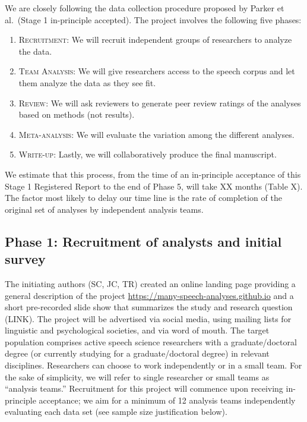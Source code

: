 \documentclass[
  12pt,
]{article}
\providecommand{\tightlist}{%
  \setlength{\itemsep}{0pt}\setlength{\parskip}{0pt}}
\begin{document}
We are closely following the data collection procedure proposed by Parker et al.~(Stage 1 in-principle accepted).
The project involves the following five phases:

\begin{enumerate}
\def\labelenumi{\arabic{enumi}.}
\tightlist
\item
  \textsc{Recruitment}: We will recruit independent groups of researchers to analyze the data.
\item
  \textsc{Team Analysis}: We will give researchers access to the speech corpus and let them analyze the data as they see fit.
\item
  \textsc{Review}: We will ask reviewers to generate peer review ratings of the analyses based on methods (not results).
\item
  \textsc{Meta-analysis}: We will evaluate the variation among the different analyses.
\item
  \textsc{Write-up}: Lastly, we will collaboratively produce the final manuscript.
\end{enumerate}

We estimate that this process, from the time of an in-principle acceptance of this Stage 1 Registered Report to the end of Phase 5, will take XX months (Table X).
The factor most likely to delay our time line is the rate of completion of the original set of analyses by independent analysis teams.

\hypertarget{phase-1-recruitment-of-analysts-and-initial-survey}{%
\subsection{Phase 1: Recruitment of analysts and initial survey}\label{phase-1-recruitment-of-analysts-and-initial-survey}}

The initiating authors (SC, JC, TR) created an online landing page providing a general description of the project \url{https://many-speech-analyses.github.io} and a short pre-recorded slide show that summarizes the study and research question (LINK).
The project will be advertised via social media, using mailing lists for linguistic and psychological societies, and via word of mouth.
The target population comprises active speech science researchers with a graduate/doctoral degree (or currently studying for a graduate/doctoral degree) in relevant disciplines.
Researchers can choose to work independently or in a small team.
For the sake of simplicity, we will refer to single researcher or small teams as ``analysis teams.''
Recruitment for this project will commence upon receiving in-principle acceptance; we aim for a minimum of 12 analysis teams independently evaluating each data set (see sample size justification below).
\end{document}
